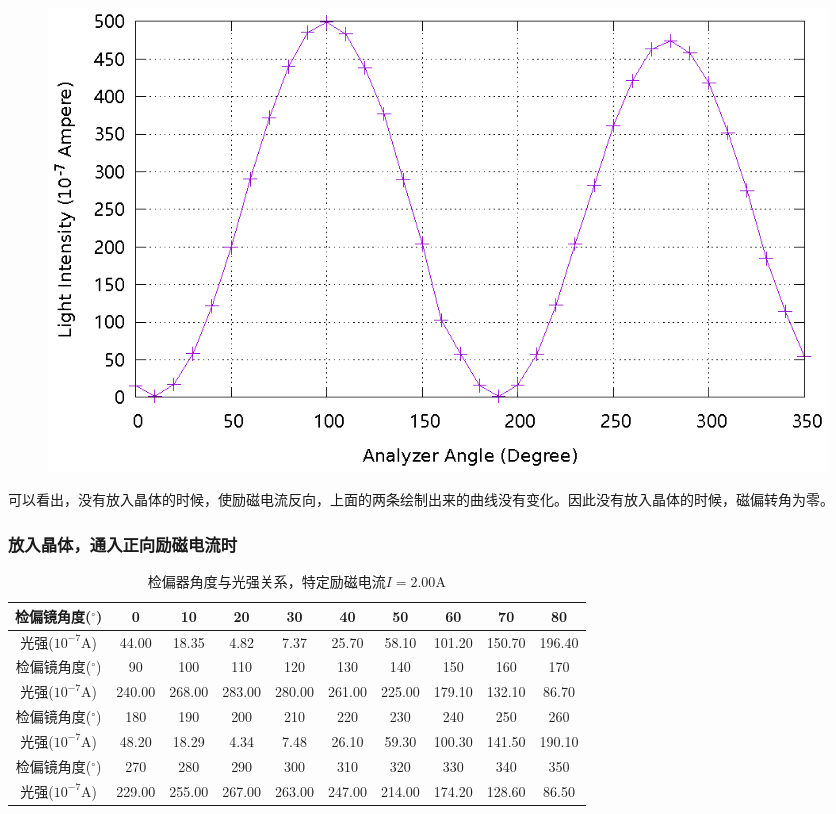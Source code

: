 \documentclass{ctexart}
\newcommand{\si}[1]{\mathrm{#1}}
\let\oldsubsubsection\subsubsection
\renewcommand{\subsubsection}[1]{\oldsubsubsection{\!\!\!\!\!\!#1}}
\begin{document}
\begin{figure}[H]
    \centering
    \includegraphics[width=\linewidth]{optics-figures/analyzer-angle-light-intensity-2.gnuplot}
\end{figure}

可以看出，没有放入晶体的时候，使励磁电流反向，上面的两条绘制出来的曲线没有变化。因此没有放入晶体的时候，磁偏转角为零。  

\newpage
\subsubsection{放入晶体，通入正向励磁电流时}

\begin{table}[H]
  \centering
  \begin{tabular}{|c|c|c|c|c|c|c|c|c|c|}
    \hline
    检偏镜角度(${}^{\circ}$)  & 0   & 10  & 20  & 30  & 40  & 50  & 60  & 70  & 80  \\\hline
    光强($10^{-7} \si{A}$) & 44.00 & 18.35 & 4.82 & 7.37 & 25.70 & 58.10 & 101.20 & 150.70 & 196.40 \\\hline
    检偏镜角度(${}^{\circ}$)  & 90  & 100 & 110 & 120 & 130 & 140 & 150 & 160 & 170 \\\hline
    光强($10^{-7} \si{A}$) & 240.00 & 268.00 & 283.00 & 280.00 & 261.00 & 225.00 & 179.10 & 132.10 & 86.70 \\\hline
    检偏镜角度(${}^{\circ}$)  & 180 & 190 & 200 & 210 & 220 & 230 & 240 & 250 & 260 \\\hline
    光强($10^{-7} \si{A}$) & 48.20 & 18.29 & 4.34 & 7.48 & 26.10 & 59.30 & 100.30 & 141.50 & 190.10 \\\hline
    检偏镜角度(${}^{\circ}$)  & 270 & 280 & 290 & 300 & 310 & 320 & 330 & 340 & 350 \\\hline
    光强($10^{-7} \si{A}$) & 229.00 & 255.00 & 267.00 & 263.00 & 247.00 & 214.00 & 174.20 & 128.60 & 86.50 \\\hline
  \end{tabular}
  \caption{检偏器角度与光强关系，特定励磁电流$I=2.00 \si{A}$}
\end{table}
\end{document}
